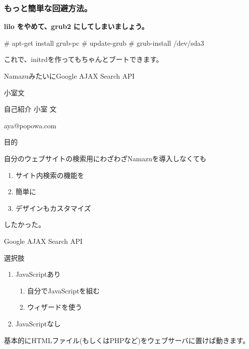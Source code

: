 \begin{frame}[containsverbatim]
\frametitle{もっと簡単な回避方法。}
\textbf{ lilo をやめて、grub2 にしてしまいましょう。}

\begin{commandline}
# apt-get install grub-pc
# update-grub
# grub-install /dev/sda3
\end{commandline}

これで、initrdを作ってもちゃんとブートできます。


\end{frame}



\begin{frame}{}

\begin{center}

 {NamazuみたいにGoogle AJAX Search API}

 小室文
\end{center}

\end{frame}


\begin{frame}{自己紹介}
 小室 文

 aya@popowa.com
\end{frame}

\begin{frame}{目的}

 自分のウェブサイトの検索用にわざわざNamazuを導入しなくても
 \begin{enumerate}
 \item サイト内検索の機能を
 \item 簡単に
 \item デザインもカスタマイズ
 \end{enumerate}
 したかった。
\end{frame}

\begin{frame}{Google AJAX Search API}

 選択肢
 \begin{enumerate}
 \item JavaScriptあり
 \begin{enumerate}
 \item 自分でJavaScriptを組む
 \item ウィザードを使う
 \end{enumerate}
 \item JavaScriptなし
 \end{enumerate}
 基本的にHTMLファイル(もしくはPHPなど)をウェブサーバに置けば動きます。

\end{frame}

